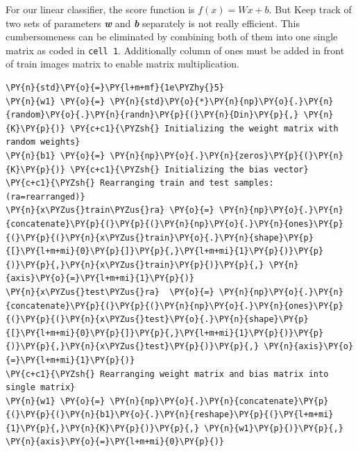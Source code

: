 \documentclass[a4paper,11pt]{article}%
\begin{document}
For our linear classifier, the score function is $f(x) = Wx +b$. But
Keep track of two sets of parameters \textbf{\textit{w}} and \textit{\textbf{b}} separately is not really efficient. This cumbersomeness can be eliminated by combining both of them into one single matrix as coded in {\tt cell 1}. Additionally column of ones must be added in front of train images matrix to enable matrix multiplication.\\
    \begin{tcolorbox}[breakable, size=fbox, boxrule=1pt, pad at break*=1mm,colback=cellbackground, colframe=cellborder]
\begin{Verbatim}[commandchars=\\\{\}]
\PY{n}{std}\PY{o}{=}\PY{l+m+mf}{1e\PYZhy{}5} 
\PY{n}{w1} \PY{o}{=} \PY{n}{std}\PY{o}{*}\PY{n}{np}\PY{o}{.}\PY{n}{random}\PY{o}{.}\PY{n}{randn}\PY{p}{(}\PY{n}{Din}\PY{p}{,} \PY{n}{K}\PY{p}{)} \PY{c+c1}{\PYZsh{} Initializing the weight matrix with random weights}
\PY{n}{b1} \PY{o}{=} \PY{n}{np}\PY{o}{.}\PY{n}{zeros}\PY{p}{(}\PY{n}{K}\PY{p}{)} \PY{c+c1}{\PYZsh{} Initializing the bias vector}
\PY{c+c1}{\PYZsh{} Rearranging train and test samples: (ra=rearranged)}
\PY{n}{x\PYZus{}train\PYZus{}ra} \PY{o}{=} \PY{n}{np}\PY{o}{.}\PY{n}{concatenate}\PY{p}{(}\PY{p}{(}\PY{n}{np}\PY{o}{.}\PY{n}{ones}\PY{p}{(}\PY{p}{(}\PY{n}{x\PYZus{}train}\PY{o}{.}\PY{n}{shape}\PY{p}{[}\PY{l+m+mi}{0}\PY{p}{]}\PY{p}{,}\PY{l+m+mi}{1}\PY{p}{)}\PY{p}{)}\PY{p}{,}\PY{n}{x\PYZus{}train}\PY{p}{)}\PY{p}{,} \PY{n}{axis}\PY{o}{=}\PY{l+m+mi}{1}\PY{p}{)}
\PY{n}{x\PYZus{}test\PYZus{}ra}  \PY{o}{=} \PY{n}{np}\PY{o}{.}\PY{n}{concatenate}\PY{p}{(}\PY{p}{(}\PY{n}{np}\PY{o}{.}\PY{n}{ones}\PY{p}{(}\PY{p}{(}\PY{n}{x\PYZus{}test}\PY{o}{.}\PY{n}{shape}\PY{p}{[}\PY{l+m+mi}{0}\PY{p}{]}\PY{p}{,}\PY{l+m+mi}{1}\PY{p}{)}\PY{p}{)}\PY{p}{,}\PY{n}{x\PYZus{}test}\PY{p}{)}\PY{p}{,} \PY{n}{axis}\PY{o}{=}\PY{l+m+mi}{1}\PY{p}{)}
\PY{c+c1}{\PYZsh{} Rearranging weight matrix and bias matrix into single matrix}
\PY{n}{w1} \PY{o}{=} \PY{n}{np}\PY{o}{.}\PY{n}{concatenate}\PY{p}{(}\PY{p}{(}\PY{n}{b1}\PY{o}{.}\PY{n}{reshape}\PY{p}{(}\PY{l+m+mi}{1}\PY{p}{,}\PY{n}{K}\PY{p}{)}\PY{p}{,} \PY{n}{w1}\PY{p}{)}\PY{p}{,} \PY{n}{axis}\PY{o}{=}\PY{l+m+mi}{0}\PY{p}{)}
\end{Verbatim}
\end{tcolorbox}
\end{document}
